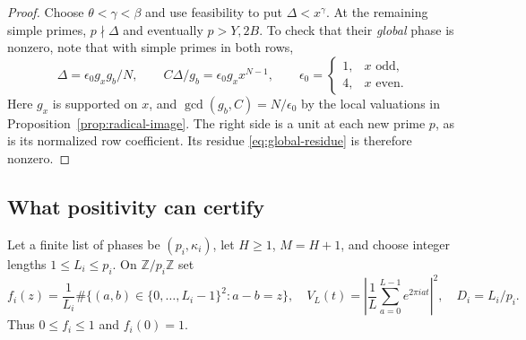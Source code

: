 \documentclass[11pt,a4paper]{article}
\theoremstyle{definition}\newtheorem{question}[theorem]{Question}
\theoremstyle{remark}\newtheorem{remark}[theorem]{Remark}
\newcommand{\Z}{\mathbb Z}\newcommand{\R}{\mathbb R}
\begin{document}
\begin{proof}
Choose $\theta<\gamma<\beta$ and use feasibility to put
$\Delta<x^\gamma$. At the remaining simple primes, $p\nmid\Delta$
and eventually $p>Y,2B$. To check that their \emph{global} phase is
nonzero, note that with simple primes in both rows,
\[
 \Delta=\epsilon_0 g_xg_b/N,\qquad
 C\Delta/g_b=\epsilon_0g_xx^{N-1},\qquad
 \epsilon_0=\begin{cases}1,&x\text{ odd},\\4,&x\text{ even}.
 \end{cases}
\]
Here $g_x$ is supported on $x$, and
$\gcd(g_b,C)=N/\epsilon_0$ by the local valuations in
Proposition~\ref{prop:radical-image}. The right side is a unit at
each new prime $p$, as is its normalized row coefficient. Its
residue \eqref{eq:global-residue} is therefore nonzero.
\end{proof}

\subsection{What positivity can certify}
Let a finite list of phases be $(p_i,\kappa_i)$, let $H\ge1$,
$M=H+1$, and choose integer lengths $1\le L_i\le p_i$.
On $\Z/p_i\Z$ set
\[
 f_i(z)=\frac1{L_i}\#\{(a,b)\in\{0,\ldots,L_i-1\}^2:a-b=z\},
 \quad V_L(t)=\left|\frac1L\sum_{a=0}^{L-1}e^{2\pi iat}\right|^2,
 \quad D_i=L_i/p_i.
\]
Thus $0\le f_i\le1$ and $f_i(0)=1$.
\end{document}
